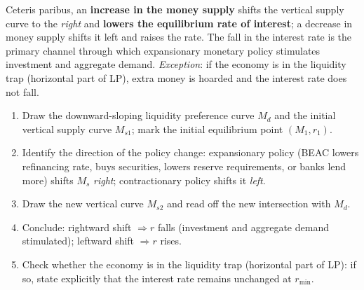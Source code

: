\documentclass[11pt]{article}
\begin{document}
\begin{propriete}
Ceteris paribus, an \textbf{increase in the money supply} shifts the vertical supply curve to the \emph{right} and \textbf{lowers the equilibrium rate of interest}; a decrease in money supply shifts it left and raises the rate. The fall in the interest rate is the primary channel through which expansionary monetary policy stimulates investment and aggregate demand. \emph{Exception}: if the economy is in the liquidity trap (horizontal part of LP), extra money is hoarded and the interest rate does not fall.
\end{propriete}

\begin{methode}
\begin{enumerate}
\item Draw the downward-sloping liquidity preference curve $M_d$ and the initial vertical supply curve $M_{s1}$; mark the initial equilibrium point $(M_1, r_1)$.
\item Identify the direction of the policy change: expansionary policy (BEAC lowers refinancing rate, buys securities, lowers reserve requirements, or banks lend more) shifts $M_s$ \emph{right}; contractionary policy shifts it \emph{left}.
\item Draw the new vertical curve $M_{s2}$ and read off the new intersection with $M_d$.
\item Conclude: rightward shift $\Rightarrow r$ falls (investment and aggregate demand stimulated); leftward shift $\Rightarrow r$ rises.
\item Check whether the economy is in the liquidity trap (horizontal part of LP): if so, state explicitly that the interest rate remains unchanged at $r_{\min}$.
\end{enumerate}
\end{methode}
\end{document}

